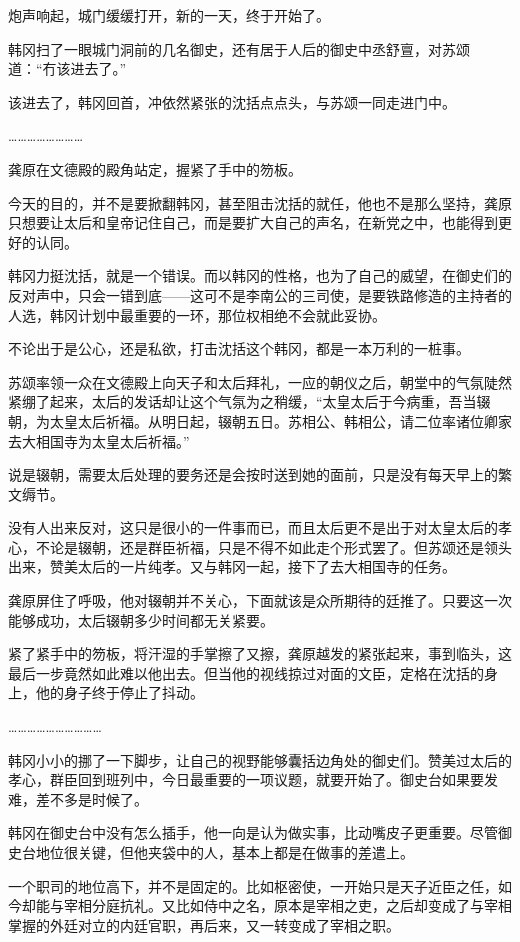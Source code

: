 炮声响起，城门缓缓打开，新的一天，终于开始了。

韩冈扫了一眼城门洞前的几名御史，还有居于人后的御史中丞舒亶，对苏颂道：“冇该进去了。”

该进去了，韩冈回首，冲依然紧张的沈括点点头，与苏颂一同走进门中。

……………………

龚原在文德殿的殿角站定，握紧了手中的笏板。

今天的目的，并不是要掀翻韩冈，甚至阻击沈括的就任，他也不是那么坚持，龚原只想要让太后和皇帝记住自己，而是要扩大自己的声名，在新党之中，也能得到更好的认同。

韩冈力挺沈括，就是一个错误。而以韩冈的性格，也为了自己的威望，在御史们的反对声中，只会一错到底——这可不是李南公的三司使，是要铁路修造的主持者的人选，韩冈计划中最重要的一环，那位权相绝不会就此妥协。

不论出于是公心，还是私欲，打击沈括这个韩冈，都是一本万利的一桩事。

苏颂率领一众在文德殿上向天子和太后拜礼，一应的朝仪之后，朝堂中的气氛陡然紧绷了起来，太后的发话却让这个气氛为之稍缓，“太皇太后于今病重，吾当辍朝，为太皇太后祈福。从明日起，辍朝五日。苏相公、韩相公，请二位率诸位卿家去大相国寺为太皇太后祈福。”

说是辍朝，需要太后处理的要务还是会按时送到她的面前，只是没有每天早上的繁文缛节。

没有人出来反对，这只是很小的一件事而已，而且太后更不是出于对太皇太后的孝心，不论是辍朝，还是群臣祈福，只是不得不如此走个形式罢了。但苏颂还是领头出来，赞美太后的一片纯孝。又与韩冈一起，接下了去大相国寺的任务。

龚原屏住了呼吸，他对辍朝并不关心，下面就该是众所期待的廷推了。只要这一次能够成功，太后辍朝多少时间都无关紧要。

紧了紧手中的笏板，将汗湿的手掌擦了又擦，龚原越发的紧张起来，事到临头，这最后一步竟然如此难以他出去。但当他的视线掠过对面的文臣，定格在沈括的身上，他的身子终于停止了抖动。

…………………………

韩冈小小的挪了一下脚步，让自己的视野能够囊括边角处的御史们。赞美过太后的孝心，群臣回到班列中，今日最重要的一项议题，就要开始了。御史台如果要发难，差不多是时候了。

韩冈在御史台中没有怎么插手，他一向是认为做实事，比动嘴皮子更重要。尽管御史台地位很关键，但他夹袋中的人，基本上都是在做事的差遣上。

一个职司的地位高下，并不是固定的。比如枢密使，一开始只是天子近臣之任，如今却能与宰相分庭抗礼。又比如侍中之名，原本是宰相之吏，之后却变成了与宰相掌握的外廷对立的内廷官职，再后来，又一转变成了宰相之职。

